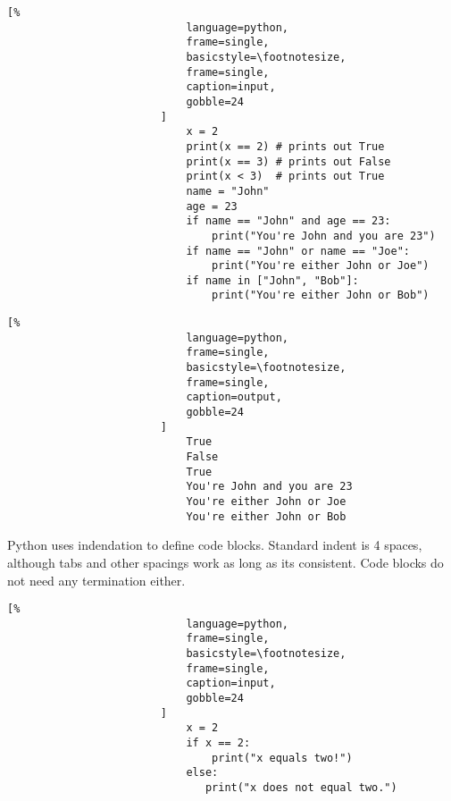 \documentclass[crop=false,class=book,oneside]{standalone}
\begin{document}
                    \begin{minipage}[t]{0.48\textwidth}
                        \begin{lstlisting}[%
                            language=python,
                            frame=single,
                            basicstyle=\footnotesize,
                            frame=single,
                            caption=input,
                            gobble=24
                        ]
                            x = 2
                            print(x == 2) # prints out True
                            print(x == 3) # prints out False
                            print(x < 3)  # prints out True
                            name = "John"
                            age = 23
                            if name == "John" and age == 23:
                                print("You're John and you are 23")
                            if name == "John" or name == "Joe":
                                print("You're either John or Joe")
                            if name in ["John", "Bob"]:
                                print("You're either John or Bob")
                    \end{lstlisting}
                    \end{minipage}\hfill
                    \begin{minipage}[t]{0.48\textwidth}
                        \begin{lstlisting}[%
                            language=python,
                            frame=single,
                            basicstyle=\footnotesize,
                            frame=single,
                            caption=output,
                            gobble=24
                        ]
                            True
                            False
                            True
                            You're John and you are 23
                            You're either John or Joe
                            You're either John or Bob
                        \end{lstlisting}
                    \end{minipage}
                    Python uses indendation to define code blocks.
                    Standard indent is 4 spaces, although tabs and other
                    spacings work as long as its consistent. Code blocks
                    do not need any termination either.
                    \newpage
                    \begin{minipage}[t]{.48\textwidth}
                        \centering
                        \begin{lstlisting}[%
                            language=python,
                            frame=single,
                            basicstyle=\footnotesize,
                            frame=single,
                            caption=input,
                            gobble=24
                        ]
                            x = 2
                            if x == 2:
                                print("x equals two!")
                            else:
                               print("x does not equal two.")
                        \end{lstlisting}
                    \end{minipage}\hfill
\end{document}
